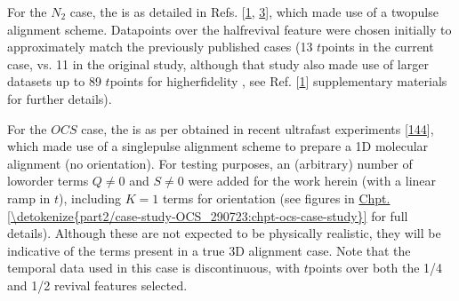 \documentclass[letterpaper,table,10pt,english]{jupyterBook}
\begin{document}
\sphinxAtStartPar
For the \(N_2\) case, the {\hyperref[\detokenize{backmatter/glossary:term-RWP}]{}} is as detailed in Refs. {[}\hyperlink{cite.backmatter/bibliography:id775}{1}, \hyperlink{cite.backmatter/bibliography:id685}{3}{]}, which made use of a two\sphinxhyphen{}pulse alignment scheme. Data\sphinxhyphen{}points over the {\hyperref[\detokenize{backmatter/glossary:term-RWP}]{}} half\sphinxhyphen{}revival feature were chosen initially to approximately match the previously published cases (13 \(t\)\sphinxhyphen{}points in the current case, vs. 11 in the original study, although that study also made use of larger datasets up to 89 \(t\)\sphinxhyphen{}points for higher\sphinxhyphen{}fidelity {\hyperref[\detokenize{backmatter/glossary:term-bootstrap-retrieval-protocol}]{}}, see Ref. {[}\hyperlink{cite.backmatter/bibliography:id775}{1}{]} supplementary materials for further details).

\sphinxAtStartPar
For the \(OCS\) case, the {\hyperref[\detokenize{backmatter/glossary:term-RWP}]{}} is as per obtained in recent ultrafast experiments {[}\hyperlink{cite.backmatter/bibliography:id970}{144}{]}, which made use of a single\sphinxhyphen{}pulse alignment scheme to prepare a 1D molecular alignment (no orientation). For testing purposes, an (arbitrary) number of low\sphinxhyphen{}order terms \(Q\neq0\) and \(S\neq0\) were added for the work herein (with a linear ramp in \(t\)), including \(K=1\) terms for orientation (see figures in \hyperref[\detokenize{part2/case-study-OCS_290723:chpt-ocs-case-study}]{Chpt.\@ \ref{\detokenize{part2/case-study-OCS_290723:chpt-ocs-case-study}}} for full details). Although these are not expected to be physically realistic, they will be indicative of the terms present in a true 3D alignment case. Note that the temporal data used in this case is discontinuous, with \(t\)\sphinxhyphen{}points over both the 1/4 and 1/2 {\hyperref[\detokenize{backmatter/glossary:term-RWP}]{}} revival features selected.
\end{document}

